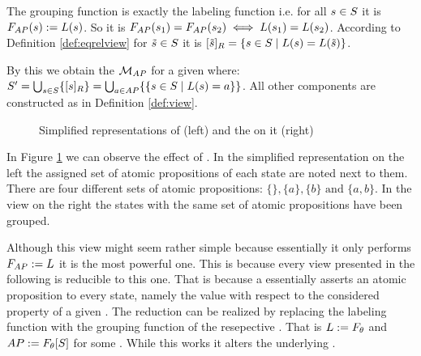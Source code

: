 \documentclass[preview]{standalone}
\begin{document}
The grouping function is exactly the labeling function i.e. for all ${s} \in {S}$ it is ${{F_{{{AP}}}}}({s}) := {L}({s})$. So it is ${{F_{{{AP}}}}}({s}_1) = {{F_{{{AP}}}}}({s}_2) \iff {L}({s}_1) = {L}({s}_2)$. According to Definition \ref{def:eqrelview} for ${\tilde{{s}}} \in {S}$ it is ${{[{\tilde{{s}}}]_{{R}}}} = \{{s} \in {S} \mid {L}({s}) = {L}({\tilde{{s}}})\}$.

By this we obtain the \viewN ${{{{{\mathcal{M}}}}_{{{AP}}}}}$ for a given \chgphN \chgph where: ${S}' = \bigcup_{{s} \in {S}} \{{{[{s}]_{{R}}}}\} =  \bigcup_{a \in {AP}} \{\{{s} \in {S} \mid {L}({s}) = a\}\}$. All other components are constructed as in Definition \ref{def:view}. 

\begin{figure}[h]
	\begin{minipage}{.6\textwidth}
		
	\end{minipage}%
	\begin{minipage}{.5\textwidth}
		
	\end{minipage}
	\caption{Simplified representations of \mdp (left) and the \viewN \viewatomicprops on it (right)}
	\label{fig:apIdentBeforeAfter}  
\end{figure}

In Figure \ref{fig:apIdentBeforeAfter} we can observe the effect of \viewatomicprops. In the simplified representation on the left the assigned set of atomic propositions of each state are noted next to them. There are four different sets of atomic propositions: $\{\}, \{a\}, \{b\} \text{ and } \{a,b\}$. In the view on the right the states with the same set of atomic propositions have been grouped.

Although this view might seem rather simple because essentially it only performs ${{F_{{{AP}}}}} := {L}$ it is the most powerful one. This is because every view presented in the following is reducible to this one. That is because a \grpfctN essentially asserts an atomic proposition to every state, namely the value with respect to the considered property of a given \viewN. The reduction can be realized by replacing the labeling function with the grouping function of the resepective \viewN. That is ${L} := {F_{{\theta}}}$ and ${AP} := {{F_{{\theta}}}}[{S}]$ for some \grpfctN \grpfct. While this works it alters the underlying \chgphN.
\end{document}
